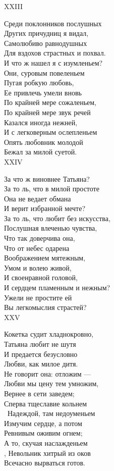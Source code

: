 {XXIII

Среди поклонников послушных\\
Других причудниц я видал,\\
Самолюбиво равнодушных\\
Для вздохов страстных и похвал.\\
И что ж нашел я с изумленьем?\\
Они, суровым повеленьем\\
Пугая робкую любовь,\\
Ее привлечь умели вновь\\
По крайней мере сожаленьем,\\
По крайней мере звук речей\\
Казался иногда нежней,\\
И с легковерным ослепленьем\\
Опять любовник молодой\\
Бежал за милой суетой.\\

XXIV

За что ж виновнее Татьяна?\\
За то ль, что в милой простоте\\
Она не ведает обмана\\
И верит избранной мечте?\\
За то ль, что любит без искусства,\\
Послушная влеченью чувства,\\
Что так доверчива она,\\
Что от небес одарена\\
Воображением мятежным,\\
Умом и волею живой,\\
И своенравной головой,\\
И сердцем пламенным и нежным?\\
Ужели не простите ей\\
Вы легкомыслия страстей?\\

XXV

Кокетка судит хладнокровно,\\
Татьяна любит не шутя\\
И предается безусловно\\
Любви, как милое дитя.\\
Не говорит она: отложим —\\
Любви мы цену тем умножим,\\
Вернее в сети заведем;\\
Сперва тщеславие кольнем\\\
Надеждой, там недоуменьем\\
Измучим сердце, а потом\\
Ревнивым оживим огнем;\\
А то, скучая наслажденьем\\,
Невольник хитрый из оков\\
Всечасно вырваться готов.\\

}
